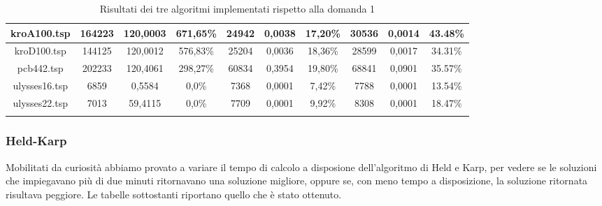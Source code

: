 \begin{center}
\begin{longtable}{|c|c|c|c|c|c|c|c|c|c|}
		kroA100.tsp& 164223 & 120,0003 & 671,65\% & 24942 & 0,0038 & 17,20\%&30536 &0,0014 &43.48\% \\ \hline
		kroD100.tsp& 144125 &120,0012 &576,83\% &25204 & 0,0036 & 18,36\% &28599 &0,0017 &34.31\% \\ \hline
		pcb442.tsp& 202233&120,4061 &298,27\% & 60834 & 0,3954 & 19,80\% &68841 &0,0901 & 35.57\%\\ \hline
		ulysses16.tsp&6859 &0,5584 & 0,0\% & 7368 & 0,0001 & 7,42\%&7788 & 0,0001 & 13.54\%\\ \hline
		ulysses22.tsp&7013 &59,4115 &0,0\% &  7709 & 0,0001 & 9,92\% &8308 &0,0001 &18.47\% \\ \hline		 
     \caption{Risultati dei tre algoritmi implementati rispetto alla domanda 1}
	\end{longtable}
\end{center}

\subsubsection{Held-Karp}
Mobilitati da curiosità abbiamo provato a variare il tempo di calcolo a disposione dell'algoritmo di Held e Karp, per vedere se le soluzioni che impiegavano più di due minuti ritornavano una soluzione migliore, oppure se, con meno tempo a disposizione, la soluzione ritornata risultava peggiore. Le tabelle sottostanti riportano quello che è stato ottenuto.
